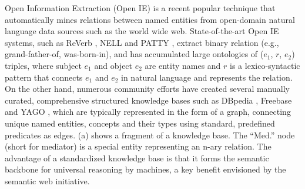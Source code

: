 
Open Information Extraction (Open IE) is a recent popular technique
that automatically mines relations between named entities
from open-domain natural language
data sources such as the world wide web.
State-of-the-art Open IE systems, such as ReVerb \cite{fader2011identifying},
NELL \cite{carlson2010toward} and PATTY \cite{nakashole2012patty}, extract binary
relation (e.g., grand-father-of, was-born-in), and has accumulated large
ontologies of ($e_1$, $r$, $e_2$) triples, where subject $e_1$ and object $e_2$ are
entity names and $r$ is a lexico-syntactic pattern that connects
$e_1$ and $e_2$ in natural language and represents the relation.
On the other hand, numerous community efforts have
created several manually curated, comprehensive structured knowledge bases
such as DBpedia \cite{auer2007dbpedia}, Freebase \cite{bollacker2008freebase} and YAGO \cite{suchanek2007yago}, which are typically represented in the form of a graph,
connecting unique named entities, concepts and their types
using standard, predefined predicates as edges.
(a) shows a fragment of a knowledge base.
The ``Med.'' node (short for mediator) is a special entity representing 
an n-ary relation.
The advantage of a standardized knowledge base is that it forms the
semantic backbone for universal reasoning by machines,
a key benefit envisioned by the semantic web initiative.

